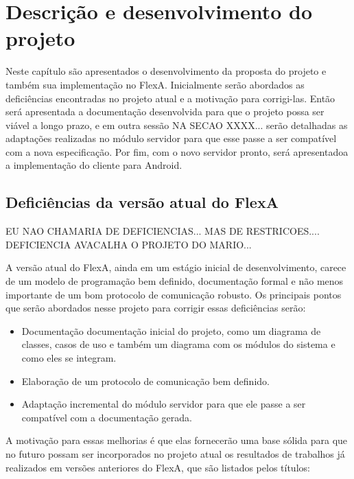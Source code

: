 % 

\chapter{Descrição e desenvolvimento do projeto}


    Neste capítulo são apresentados o desenvolvimento da proposta do projeto e também sua implementação no FlexA. Inicialmente serão abordados as deficiências encontradas no projeto atual e a motivação para corrigi-las. Então será apresentada a documentação desenvolvida para que o projeto possa ser viável a longo prazo, e em outra sessão  NA SECAO XXXX... serão detalhadas as adaptações realizadas no módulo servidor para que esse passe a ser compatível com a nova especificação. Por fim, com o novo servidor pronto, será apresentadoa a implementação do cliente para Android.
    \section{Deficiências da versão atual do FlexA}
    EU NAO CHAMARIA DE DEFICIENCIAS...  MAS DE RESTRICOES....  DEFICIENCIA AVACALHA O PROJETO DO MARIO...
    
        A versão atual do FlexA, ainda em um estágio inicial de desenvolvimento, carece de um modelo de programação bem definido, documentação formal e não menos importante de um bom protocolo de comunicação robusto.
        Os principais pontos que serão abordados nesse projeto para corrigir essas deficiências serão:
        
        \begin{itemize}
            \item Documentação documentação inicial do projeto, como um diagrama de classes, casos de uso e também um diagrama com os módulos do sistema e como eles se integram.
            \item Elaboração de um protocolo de comunicação bem definido.
            \item Adaptação incremental do módulo servidor para que ele passe a ser compatível com a documentação gerada.
        \end{itemize}
        
        A motivação para essas melhorias é que elas fornecerão uma base sólida para que no futuro possam ser incorporados no projeto atual os resultados de trabalhos já realizados em versões anteriores do FlexA, que são listados pelos títulos:
        
